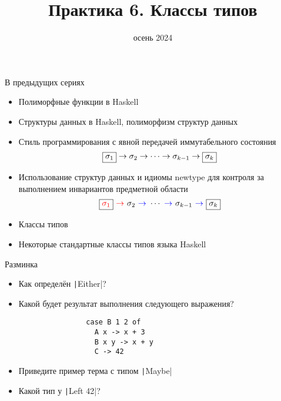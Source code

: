 
\newif\ifhandout




\title[6. Классы типов]{Практика 6. Классы типов}
\date{осень 2024}



    \setcounter{framenumber}{-1}
    \mymaketitle

    \begin{frame}[fragile]{В предыдущих сериях}
        \begin{itemize}
            \item Полиморфные функции в Haskell
            \item Структуры данных в Haskell, полиморфизм структур данных
            \item[\NB] Стиль программирования с явной передачей иммутабельного состояния
            \begin{equation*}
                \framebox{$\sigma_1$} \to \sigma_2 \to \cdots \to \sigma_{k - 1} \to \framebox{$\sigma_k$}
            \end{equation*}
            \item[\NB] Использование структур данных и идиомы newtype для контроля за выполнением инвариантов предметной области
            \begin{equation*}
                \framebox{\color{red}$\sigma_1$} {~\color{red} \rightarrow~} \sigma_2 {~\color{blue} \to~} \cdots {~\color{blue} \to~} \sigma_{k - 1} {~\color{blue} \to~} \framebox{$\sigma_k$}
            \end{equation*}
            \item[\newtopic] Классы типов
            \item[\newtopic] Некоторые стандартные классы типов языка Haskell
        \end{itemize}
    \end{frame}

    \begin{frame}[fragile]{Разминка}
        \begin{itemize}
            \item[\todo] Как определён \texttt|Either|?
            \item[\todo] Какой будет результат выполнения следующего выражения?
            \begin{verbatim}
                case B 1 2 of
                  A x -> x + 3
                  B x y -> x + y
                  C -> 42
            \end{verbatim}
            \item[\todo] Приведите пример терма с типом \texttt|Maybe|
            \item[\todo] Какой тип у \texttt|Left 42|?
        \end{itemize}
    \end{frame}

